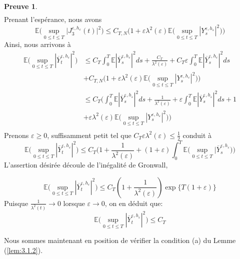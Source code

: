 \documentclass[12pt,a4paper,twoside]{report}%
\theoremstyle{definition}
\newtheorem*{pr}{\textbf{Preuve}}
\numberwithin{equation}{section}
\begin{document}
\begin{pr}
\[\begin{aligned}
	\end{aligned}
\]
Prenant l'espérance, nous avons
\[
\mathbb{E}\Big(\sup_{0 \leq t \leq T}\Big|J_3^{\varepsilon,h_\varepsilon}(t)\Big|^2\Big) \leq C_{T,N}\Big(1 + \varepsilon\lambda^2(\varepsilon)\mathbb{E}\Big(\sup_{0 \leq t \leq T}|Y_s^{\varepsilon,h_\varepsilon}|^2\Big)\Big)
\] 
Ainsi, nous arrivons à
\[\begin{aligned}
\mathbb{E}\Big(\sup_{0\leq t\leq T}|\overline{Y}_{t}^{\varepsilon,h_{\varepsilon}} |^2\Big)&\leq  C_T\int_{0}^{T}\mathbb{E}|\overline{Y}_s^{\varepsilon,h_\varepsilon}|^2ds +  \frac{C_T}{\lambda^2(\varepsilon)} + C_T\varepsilon \int_{0}^{T}\mathbb{E}|\overline{Y}_s^{\varepsilon,h_\varepsilon}|^2ds\\ &+ C_{T,N}\Big(1 + \varepsilon\lambda^2(\varepsilon)\mathbb{E}\Big(\sup_{0 \leq t \leq T}|Y_s^{\varepsilon,h_\varepsilon}|^2\Big)\Big)\\
&\leq C_T\Big(\int_{0}^{T}\mathbb{E}|\overline{Y}_s^{\varepsilon,h_\varepsilon}|^2ds + \frac{1}{\lambda^2(\varepsilon)}+\varepsilon\int_{0}^{T}\mathbb{E}|\overline{Y}_s^{\varepsilon,h_\varepsilon}|^2ds + 1\\& + \varepsilon\lambda^2(\varepsilon)\mathbb{E}\Big(\sup_{0 \leq t \leq T}|Y_s^{\varepsilon,h_\varepsilon}|^2\Big)\Big)\\
\end{aligned}
\]
Prenons $\varepsilon \geq 0$, suffisamment petit tel que $C_T\varepsilon\lambda^2(\varepsilon)\leq\frac{1}{2}$ conduit à 
\[
\mathbb{E}\Big(\sup_{0 \leq t \leq T}|\overline{Y}_t^{\varepsilon,h_\varepsilon}|^2\Big) \leq C_T\Big(1+\frac{1}{\lambda^2(\varepsilon)}+(1+\varepsilon)\int_{0}^{T}\mathbb{E}\Big(\sup_{0\leq t\leq T}|\overline{Y}_s^{\varepsilon,h_\varepsilon}\Big)\Big)
\]
L'assertion désirée découle de l'inégalité de Gronwall,

\[
\mathbb{E}\Big(\sup_{0 \leq t \leq T}|\overline{Y}_t^{\varepsilon,h_\varepsilon}|^2\Big)\leq C_T(1+\frac{1}{\lambda^2(\varepsilon)})\exp\{T(1+\varepsilon)\}
\]
Puisque $\frac{1}{\lambda^2(t)}\to 0$ lorsque $\varepsilon\to0$, on en déduit que:
\[
\mathbb{E}\Big(\sup_{0 \leq t \leq T}|\overline{Y}_t^{\varepsilon,h_\varepsilon}|^2\Big)\leq C_T
\]	
\end{pr}
Nous sommes maintenant en position de vérifier la condition (a) du Lemme (\ref{lem:3.1.2}).
\end{document}
